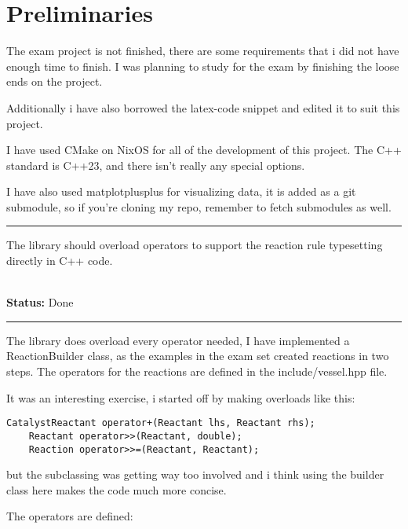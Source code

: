 \newcommand{\requirement}[2]{
    \newpage
    \hrule
    \vspace{10pt}
    {
        \large \noindent #1
    }\\
    \textbf{Status:} #2
    \vspace{10pt}
    \hrule
    \vspace{10pt}
}

\section{Preliminaries}
The exam project is not finished, there are some requirements that i did not have enough time to finish. I was planning to study for the exam by finishing the loose ends on the project.

Additionally i have also borrowed the latex-code snippet and edited it to suit this project.

I have used CMake on NixOS for all of the development of this project. The C++ standard is C++23, and there isn't really any special options.

I have also used matplotplusplus for visualizing data, it is added as a git submodule, so if you're cloning my repo, remember to fetch submodules as well.

\requirement{
    The library should overload operators to support the reaction rule typesetting directly in C++ code.
}{Done}
The library does overload every operator needed, I have implemented a ReactionBuilder class, as the examples in the exam set created reactions in two steps. The operators for the reactions are defined in the include/vessel.hpp file.

It was an interesting exercise, i started off by making overloads like this:

\begin{lstlisting}[style=colorC++]
    CatalystReactant operator+(Reactant lhs, Reactant rhs);
    Reactant operator>>(Reactant, double);
    Reaction operator>>=(Reactant, Reactant);
\end{lstlisting}

but the subclassing was getting way too involved and i think using the builder class here makes the code much more concise.

The operators are defined:

